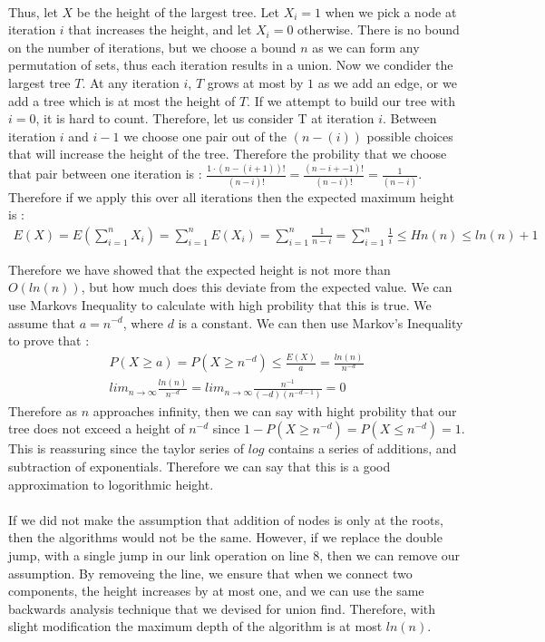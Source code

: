 \documentclass[]{article}
\begin{document}
\paragraph{} 
Thus, let $X$ be the height of the largest tree. Let $X_i = 1$ when we pick a node at iteration $i$ that increases the height, and let $X_i=0$ otherwise. There is no bound on the number of iterations, but we choose a bound $n$ as we can form any permutation of sets, thus each iteration results in a union. Now we condider the largest tree $T$. At any iteration $i$, $T$ grows at most by $1$ as we add an edge, or we add a tree which is at most the height of $T$. If we attempt to build our tree with $i=0$, it is hard to count. Therefore, let us consider T at iteration $i$. Between iteration $i$ and $i-1$ we choose one pair out of the $(n-(i))$ possible choices that will increase the height of the tree. Therefore the probility that we choose that pair between one iteration is : $\frac{1\cdot(n-(i+1))!}{(n-i)!} = \frac{(n-i+-1)!}{(n-i)!} = \frac{1}{(n-i)}$. Therefore if we apply this over all iterations then the expected maximum height is :
\begin{align*}
  E(X) = E(\sum_{i=1}^{n}X_i) = \sum_{i=1}^{n}E(X_i) = \sum_{i=1}^{n}\frac{1}{n-i} = \sum_{i=1}^{n}\frac{1}{i} \le Hn(n) \le ln(n) +1
\end{align*}

Therefore we have showed that the expected height is not more than $O(ln(n))$, but how much does this deviate from the expected value.
We can use Markovs Inequality to calculate with high probility that this is true. We assume that $a = {n^{-d}}$, where $d$ is a constant. We can then use Markov's Inequality to prove that :
\begin{align*}
  P(X\ge a) = P(X \ge n^{-d}) \le \frac{E(X)}{a} = \frac{ln(n)}{n^{-d}}\\
  lim_{n\rightarrow\infty} \frac{ln(n)}{n^{-d}} = lim_{n\rightarrow\infty}\frac{n^{-1}}{(-d)(n^{-d-1})} = 0 
\end{align*}
Therefore as $n$ approaches infinity, then we can say with hight probility that our tree does not exceed a height of $n^{-d}$ since $1-P(X \ge n^{-d}) = P(X \le n^{-d}) = 1$. This is reassuring since the taylor series of $log$ contains a series of additions, and subtraction of exponentials. Therefore we can say that this is a good approximation to logorithmic height.


\paragraph{}
If we did not make the assumption that addition of nodes is only at the roots, then the algorithms would not be the same. However, if we replace the double jump, with a single jump in our link operation on line 8, then we can remove our assumption. By removeing the line, we ensure that when we connect two components, the height increases by at most one, and we can use the same backwards analysis technique that we devised for union find. Therefore, with slight modification the maximum depth of the algorithm is at most $ln(n)$.
\end{document}
